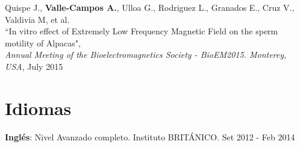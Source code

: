 \documentclass[margin,line]{res}
\begin{document}
\begin{resume}
		Quispe J., \textbf{Valle-Campos A.}, Ulloa G., Rodriguez L., Granados E., Cruz V., Valdivia M, et al.\\ ``In vitro effect of Extremely Low Frequency Magnetic Field on the sperm motility of Alpacas", \\ {\em Annual Meeting of the Bioelectromagnetics Society - BioEM2015. Monterey, USA}, July 2015\\
		
		
		
		
		
		
		\section{\sc Idiomas}
		{\bf Inglés}: Nivel Avanzado completo. Instituto BRITÁNICO. \hfill {Set 2012 - Feb 2014} \\
		

\end{resume}
\end{document}
